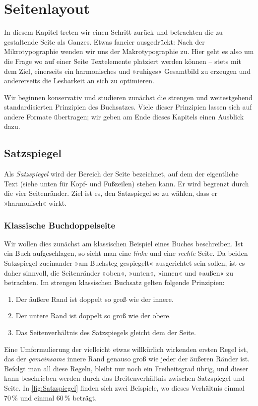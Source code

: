 \chapter{Seitenlayout}

In diesem Kapitel treten wir einen Schritt zurück und betrachten die zu
gestaltende Seite als Ganzes. Etwas fancier ausgedrückt: Nach der
Mikrotypographie wenden wir uns der Makrotypographie zu. Hier geht es also um
die Frage wo auf einer Seite Textelemente platziert werden können – stets mit
dem Ziel, einerseits ein harmonisches und »ruhiges« Gesamtbild zu erzeugen und
andererseits die Lesbarkeit an sich zu optimieren.

Wir beginnen konservativ und studieren zunächst die strengen und weitestgehend
standardisierten Prinzipien des Buchsatzes. Viele dieser Prinzipien lassen sich
auf andere Formate übertragen; wir geben am Ende dieses Kapitels einen Ausblick
dazu.

\section{Satzspiegel}

Als \emph{Satzspiegel} wird der Bereich der Seite bezeichnet, auf dem der
eigentliche Text (siehe unten für Kopf- und Fußzeilen) stehen kann. Er wird
begrenzt durch die vier Seitenränder. Ziel ist es, den Satzspiegel so zu wählen,
dass er »harmonisch« wirkt.

\subsection{Klassische Buchdoppelseite}

Wir wollen dies zunächst am klassischen Beispiel eines Buches beschreiben. Ist
ein Buch aufgeschlagen, so sieht man eine \emph{linke} und eine \emph{rechte}
Seite. Da beiden Satzspiegel zueinander »am Buchsteg gespiegelt« ausgerichtet
sein sollen, ist es daher sinnvoll, die Seitenränder »oben«, »unten«, »innen«
und »außen« zu betrachten. Im strengen klassischen Buchsatz gelten folgende
Prinzipien:
\begin{enumerate}[nosep]
\item Der äußere Rand ist doppelt so groß wie der innere.
\item Der untere Rand ist doppelt so groß wie der obere.
\item Das Seitenverhältnis des Satzspiegels gleicht dem der Seite.
\end{enumerate}
Eine Umformulierung der vielleicht etwas willkürlich wirkenden ersten Regel ist,
das der \emph{gemeinsame} innere Rand genauso groß wie jeder der äußeren Ränder
ist. Befolgt man all diese Regeln, bleibt nur noch ein Freiheitsgrad übrig, und
dieser kann beschrieben werden durch das Breitenverhältnis zwischen Satzspiegel
und Seite. In \cref{fig:Satzspiegel} finden sich zwei Beispiele, wo dieses
Verhältnis einmal 70\,\% und einmal 60\,\% beträgt.

